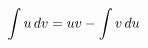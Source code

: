 \documentclass[preview]{standalone}
\begin{document}
\begin{align*}
\special{dvisvgm:raw <g id='unique000'>}\int u\,dv = uv - \int v\,du\special{dvisvgm:raw </g>}
\end{align*}
\end{document}
